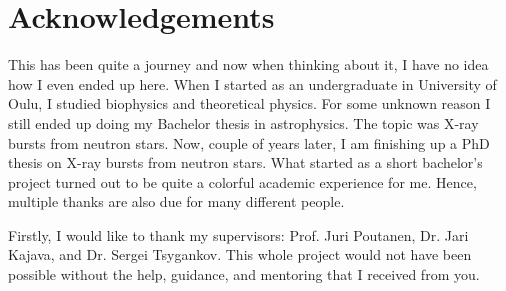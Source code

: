 \chapter*{Acknowledgements}


This has been quite a journey and now when thinking about it, I have no idea how I even ended up here.
When I started as an undergraduate in University of Oulu, I studied biophysics and theoretical physics.
For some unknown reason I still ended up doing my Bachelor thesis in astrophysics.
The topic was X-ray bursts from neutron stars.
Now, couple of years later, I am finishing up a PhD thesis on X-ray bursts from neutron stars.
What started as a short bachelor's project turned out to be quite a colorful academic experience for me.
Hence, multiple thanks are also due for many different people.



Firstly, I would like to thank my supervisors: Prof. Juri Poutanen, Dr. Jari Kajava, and Dr. Sergei Tsygankov.
This whole project would not have been possible without the help, guidance, and mentoring that I received from you.


 

